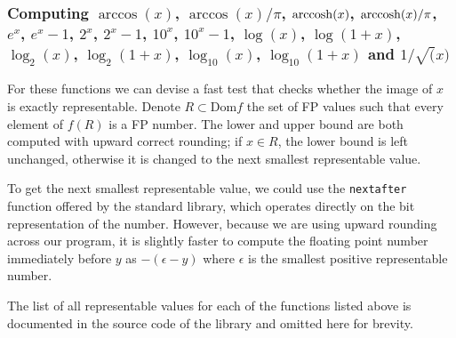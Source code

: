 \subsubsection{Computing $\arccos(x)$, $\arccos(x)/\pi$, $\operatorname{arccosh}(x)$, $\operatorname{arccosh}(x)/\pi$, $e^x$, $e^x-1$, $2^x$, $2^x-1$, $10^x$, $10^x-1$, $\log(x)$, $\log(1+x)$, $\log_2(x)$, $\log_2(1+x)$, $\log_{10}(x)$, $\log_{10}(1+x)$ and $1/\sqrt(x)$}
\label{sub:exactR}
For these functions we can devise a fast test that checks whether the image of $x$ is exactly representable.
Denote $R\subset\mathrm{Dom}f$ the set of FP values such that every element of $f(R)$ is a FP number.
The lower and upper bound are both computed with upward correct rounding; if $x\in R$, the lower bound is left unchanged, otherwise it is changed to the next smallest representable value.

To get the next smallest representable value, we could use the \texttt{nextafter} function offered by the standard library, which operates directly on the bit representation of the number. However, because we are using upward rounding across our program, it is slightly faster to compute the floating point number immediately before $y$ as $-(\epsilon-y)$ where $\epsilon$ is the smallest positive representable number.

The list of all representable values for each of the functions listed above is documented in the source code of the library and omitted here for brevity.

